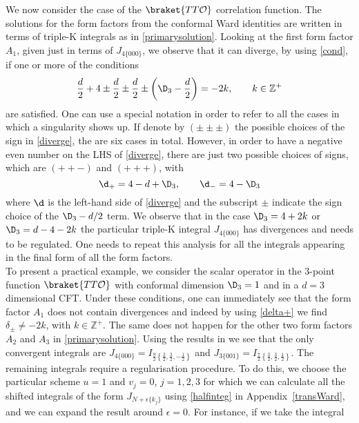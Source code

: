 \documentclass[a4paper,11pt,openright,twoside]{book}
\newcommand{\mO}{\mathcal{O}}
\let\e=\epsilon \let\z=\zeta   \let\h=\eta     \let\q=\theta
\newcommand{\appref}[1]{Appendix~\ref{#1}}		%
\numberwithin{equation}{section}
\begin{document}
{{{{	We now consider the case of the $\braket{TT\mO}$ correlation function. The solutions for the form factors from the conformal Ward identities are written in terms of triple-K integrals as in  \eqref{primarysolution}. Looking at the first form factor $A_1$, given just in terms of $J_{4\{000\}}$, we observe that it can diverge, by using \eqref{cond}, if one or more of the conditions
	\begin{equation}
		\frac{d}{2}+4\pm\frac{d}{2}\pm\frac{d}{2}\pm\left(\D_3-\frac{d}{2}\right)=-2k,\qquad k\in\mathbb{Z}^+\label{diverge}
	\end{equation}
	are satisfied. One can use a special notation in order to refer to all the cases in which a singularity shows up. If  denote by $(\pm\pm\pm)$ the possible choices of the sign in \eqref{diverge},  the are six cases in total. However, in order to have a negative even number on the LHS of \eqref{diverge}, there are just two possible choices of signs, which are $(++-)$ and $(+++)$, with
	\begin{equation}
		\d_{+}=4-d+\D_3,\qquad\d_{-}=4-\D_3\label{delta+}
	\end{equation}
	where $\d$ is the left-hand side of \eqref{diverge} and the subscript $\pm$ indicate the sign choice  of the $\D_3-d/2$ term. We observe that in the case $\D_3=4+2k$ or $\D_3=d-4-2k$ the particular triple-K integral $J_{4\{000\}}$ has divergences and needs to be regulated. One needs to repeat this analysis for all the integrals appearing in the final form of all the form factors.\\
	To present a practical example, we consider the scalar operator in the $3$-point function $\braket{TT\mO}$ with conformal dimension $\D_3=1$ and in a $d=3$ dimensional CFT. Under these conditions, one can immediately see that the form factor $A_1$ does not contain divergences and indeed by using \eqref{delta+} we find $\delta_{\pm}\ne-2k$, with $k\in\mathbb{Z}^+$. The same does not happen for the other two form factors $A_2$ and $A_3$ in \eqref{primarysolution}.   
	Using the results in \cite{Bzowski:2013sza,Bzowski:2015yxv} we see that the only convergent integrals are $J_{4\{000\}}=I_{\frac{9}{2}\left\{\frac{3}{2},\frac{3}{2},-\frac{1}{2}\right\}}$ and $J_{3\{001\}}=I_{\frac{7}{2}\left\{\frac{3}{2},\frac{3}{2},\frac{1}{2}\right\}}$. The remaining integrals require a regularisation procedure. To do this, we choose the particular scheme $u=1$ and $v_j=0$, $j=1,2,3$ for which we can calculate all the shifted integrals of the form $J_{N+\e\{k_j\}}$ using \eqref{halfinteg} in \appref{transWard}, and we can expand the result around $\e=0$. For instance, if we take the integral
}}}}
\end{document}
